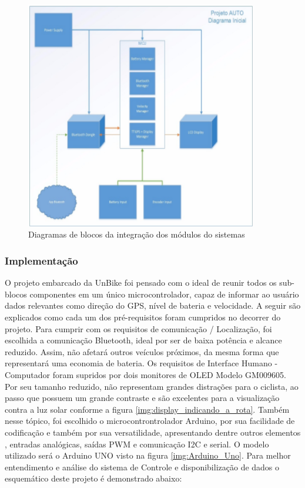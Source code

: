  		\newpage
 			\graphicspath{{figuras/}}
 			\begin{figure}[H]
 				\centering
 				\includegraphics[width=0.9\textwidth]{Figura6_Diagrama_de_modulos_do_sistema.PNG}
 				\caption{Diagramas de blocos da integração dos módulos do sistemas}
 				\label{img:Diagrama_de_modulos_do_sistema}
 			\end{figure}
 		 		
		\subsubsection{Implementação}
		O projeto embarcado da UnBike foi pensado com o ideal de reunir todos os sub-blocos componentes em um único microcontrolador, capaz de informar ao usuário dados relevantes como direção do GPS, nível de bateria e velocidade. A seguir são explicados como cada um dos pré-requisitos foram cumpridos no decorrer do projeto.
		Para cumprir com os requisitos de  comunicação / Localização, foi escolhida a comunicação Bluetooth, ideal por ser de baixa potência e alcance reduzido. Assim, não afetará outros veículos próximos, da mesma forma que representará uma economia de bateria. 
		Os requisitos de Interface Humano - Computador foram supridos por dois monitores de OLED Modelo GM009605. Por seu tamanho reduzido, não representam grandes distrações para o ciclista, ao passo que possuem um grande contraste e são excelentes para a visualização contra a luz solar conforme a figura \ref{img:display_indicando_a_rota}. Também nesse tópico, foi escolhido o microcontrontrolador Arduino, por sua facilidade de codificação e também por sua versatilidade, apresentando dentre outros elementos , entradas analógicas, saídas PWM e comunicação I2C e serial. O modelo utilizado será o Arduino UNO visto na figura \ref{img:Arduino_Uno}.
		Para melhor entendimento e análise do sistema de Controle e disponibilização de dados o esquemático deste projeto é demonstrado abaixo:
		
